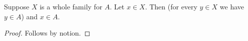 

\begin{proposition}\label{whole_universal_stays_exact}
    Suppose $X$ is a whole family for $A$.
    Let $x\in X$.
    Then (for every $y\in X$ we have $y\in A$) and $x\in A$.
\end{proposition}
\begin{proof}
    Follows by notion.
\end{proof}
